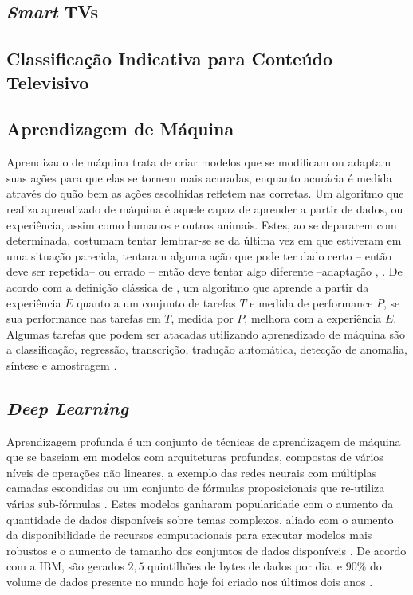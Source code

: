 
\subsection{\emph{Smart} TVs}


\subsection{Classificação Indicativa para Conteúdo Televisivo}


\subsection{Aprendizagem de Máquina}
Aprendizado de máquina trata de criar modelos que se modificam ou adaptam suas ações para que elas se tornem mais acuradas, enquanto acurácia é medida através do quão bem as ações escolhidas refletem nas corretas.
Um algoritmo que realiza aprendizado de máquina é aquele capaz de aprender a partir de dados, ou experiência, assim como humanos e outros animais. Estes, ao se depararem com determinada, costumam tentar lembrar-se se da última vez em que estiveram em uma situação parecida, tentaram alguma ação que pode ter dado certo -- então deve ser repetida-- ou errado -- então deve tentar algo diferente --adaptação \cite{marsland2015machine}, \cite{goodfellow2016deep}. De acordo com a definição clássica de \cite{mitchell1997machine}, um algoritmo que aprende a partir da experiência $E$ quanto a um conjunto de tarefas $T$ e medida de performance $P$, se sua performance nas tarefas em $T$, medida por $P$, melhora com a experiência $E$.
Algumas tarefas que podem ser atacadas utilizando aprensdizado de máquina são a classificação, regressão, transcrição, tradução automática, detecção de anomalia, síntese e amostragem \cite{goodfellow2016deep}.

\subsection{\emph{Deep Learning}}
Aprendizagem profunda é um conjunto de técnicas de aprendizagem de máquina que se baseiam em modelos com arquiteturas profundas, compostas de vários níveis de operações não lineares, a exemplo das redes neurais com múltiplas camadas escondidas ou um conjunto de fórmulas proposicionais que re-utiliza várias sub-fórmulas \cite{bengio2009learning}. Estes modelos ganharam popularidade com o aumento da quantidade de dados disponíveis sobre temas complexos, aliado com o aumento da disponibilidade de recursos computacionais para executar modelos mais robustos e o aumento de tamanho dos conjuntos de dados disponíveis \cite{goodfellow2016deep}. De acordo com a IBM, são gerados $2,5$ quintilhões de bytes de dados por dia, e $90\%$ do volume de dados presente no mundo hoje foi criado nos últimos dois anos \cite{ibm2017bigdata}.


